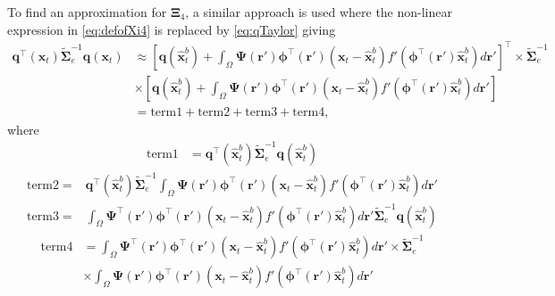 \documentclass[]{article}
\begin{document}
To find an approximation for $\boldsymbol\Xi_4$, a similar approach is used where the non-linear expression in \eqref{eq:defofXi4} is replaced by \eqref{eq:qTaylor}  giving
\begin{align}\label{eq:Xi4derivation1}
 \mathbf q^\top(\mathbf x_t)\tilde{\boldsymbol\Sigma}_e^{-1}\mathbf q(\mathbf x_t)&\approx \left[ \mathbf q(\mathbf {\hat x}_t^b)+\int_\Omega \boldsymbol{\Psi}(\mathbf{r}')\boldsymbol \phi^\top(\mathbf r') (\mathbf x_t - \mathbf  {\hat x}_t^b)f'(\boldsymbol \phi^\top(\mathbf r')\mathbf {\hat x}_t^b) d\mathbf{r}'\right]^\top  \times \tilde{\boldsymbol\Sigma}_e^{-1}\nonumber \\
&\times\left[ \mathbf q(\mathbf {\hat x}_t^b)+\int_\Omega \boldsymbol{\Psi}(\mathbf{r}')\boldsymbol \phi^\top(\mathbf r') (\mathbf x_t - \mathbf  {\hat x}_t^b)f'(\boldsymbol \phi^\top(\mathbf r')\mathbf {\hat x}_t^b) d\mathbf{r}'\right] \nonumber \\
&= \mathrm{term1} + \mathrm{term2} + \mathrm{term3} + \mathrm{term4},
\end{align}
where
\begin{align}
  \mathrm{term1}&=\mathbf q^\top(\mathbf {\hat x}_t^b)\tilde{\boldsymbol\Sigma}_e^{-1}\mathbf q(\mathbf {\hat x}_t^b)
\end{align}
\begin{align}
\mathrm{term2}=&\mathbf q^\top(\mathbf {\hat x}_t^b)\tilde{\boldsymbol\Sigma}_e^{-1}\int_\Omega \boldsymbol{\Psi}(\mathbf{r}')\boldsymbol \phi^\top(\mathbf r') (\mathbf x_t - \mathbf  {\hat x}_t^b)f'(\boldsymbol \phi^\top(\mathbf r')\mathbf {\hat x}_t^b) d\mathbf{r}'
 \end{align}
\begin{align}
\mathrm{term3}=&\int_\Omega \boldsymbol{\Psi}^\top(\mathbf{r}')\boldsymbol \phi^\top(\mathbf r') (\mathbf x_t - \mathbf  {\hat x}_t^b)f'(\boldsymbol \phi^\top(\mathbf r')\mathbf {\hat x}_t^b) d\mathbf{r}'\tilde{\boldsymbol\Sigma}_e^{-1}\mathbf q(\mathbf {\hat x}_t^b)
\end{align}
\begin{align}\label{eq:-EMterm4}
 \mathrm{term4} &=\int_\Omega \boldsymbol{\Psi}^\top(\mathbf{r}')\boldsymbol \phi^\top(\mathbf r') (\mathbf x_t - \mathbf  {\hat x}_t^b)f'(\boldsymbol \phi^\top(\mathbf r')\mathbf {\hat x}_t^b) d\mathbf{r}' \times \tilde{\boldsymbol  \Sigma}_e^{-1} \nonumber \\
&\times \int_\Omega \boldsymbol{\Psi}(\mathbf{r}')\boldsymbol \phi^\top(\mathbf r') (\mathbf x_t - \mathbf  {\hat x}_t^b)f'(\boldsymbol \phi^\top(\mathbf r')\mathbf {\hat x}_t^b) d\mathbf{r}' 
\end{align}
\end{document}
